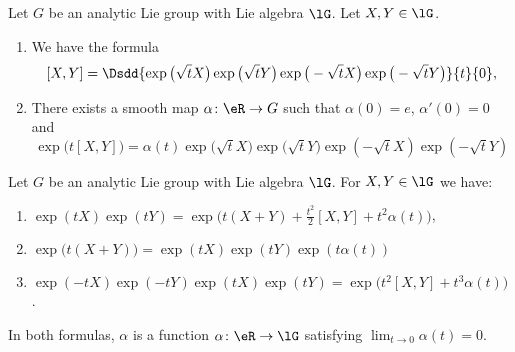 \begin{lemma}        \label{LEMooGMMNooVlDkNm}
	Let \( G\) be an analytic Lie group with Lie algebra \( \lG\). Let \( X,Y\in \lG\).
	\begin{enumerate}
		\item
		      We have the formula
		      \begin{equation}        \label{EQooDCUJooYDDZHD}
			      [X,Y]=\Dsdd{ \exp\big( \sqrt{ t }X \big)\exp\big( \sqrt{ t }Y \big)\exp\big( -\sqrt{ t }X \big)\exp\big( -\sqrt{ t }Y \big) }{t}{0},
		      \end{equation}
		\item
		      There exists a smooth map \( \alpha\colon \eR\to G\) such that \( \alpha(0)=e\), \( \alpha'(0)=0\) and
		      \begin{equation}
			      \exp\big( t[X,Y] \big)=\alpha(t)\exp\big( \sqrt{ t }X \big)\exp\big( \sqrt{ t }Y \big)\exp(-\sqrt{ t }X)\exp(-\sqrt{ t }Y)
		      \end{equation}
	\end{enumerate}
\end{lemma}

\begin{lemma}     \label{LEMooMJBRooMOuJpa}
	Let \( G\) be an analytic Lie group with Lie algebra \( \lG\). For \( X,Y\in \lG\) we have:
	\begin{enumerate}
		\item       \label{ITEMooHVOIooKDrUSw}
		      \( \exp(tX)\exp(tY)=\exp\big( t(X+Y)+\frac{ t^2 }{2}[X,Y]+t^2\alpha(t) \big)\),
		\item       \label{ITEMooWIQIooHphJcP}
		      \( \exp\big( t(X+Y) \big)=\exp(tX)\exp(tY)\exp(t\alpha(t))\)
		\item       \label{ITEMooVMDCooExpIrp}
		      \( \exp(-tX)\exp(-tY)\exp(tX)\exp(tY)=\exp\big( t^2[X,Y]+t^3\alpha(t) \big)\).
	\end{enumerate}
	In both formulas, \( \alpha\) is a function \( \alpha\colon \eR\to \lG\) satisfying \( \lim_{t\to 0} \alpha(t)=0\).
\end{lemma}

